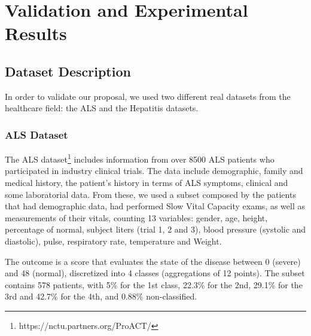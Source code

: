 
\chapter{Validation and Experimental Results}
\label{chapter:results}


\section{Dataset Description}
\label{section:datasets}
In order to validate our proposal, we used two different real datasets from the healthcare field: the ALS and the Hepatitis datasets.

\subsection{ALS Dataset}
\label{subsection:als}

The ALS dataset\footnote{https://nctu.partners.org/ProACT/} includes information from over 8500 ALS patients who participated in industry
 clinical trials. The data include demographic, family and medical history, the patient's history in terms of ALS symptoms,
 clinical and some laboratorial data. From these, we used a subset composed by the patients that had demographic data, had 
 performed Slow Vital Capacity exams, as well as measurements of their vitals, counting 13 variables: gender, age, height, 
 percentage of normal, subject liters (trial 1, 2 and 3), blood pressure (systolic and diastolic), pulse, respiratory rate,
 temperature and Weight. 

The outcome is a score that evaluates the state of the disease between 0 (severe) and 48 (normal), discretized into 
4 classes (aggregations of 12 points). The subset contains 578 patients, with 5\% for the 1st class, 22.3\% for the 2nd,
 29.1\% for the 3rd and 42.7\% for the 4th, and 0.88\% non-classified.

